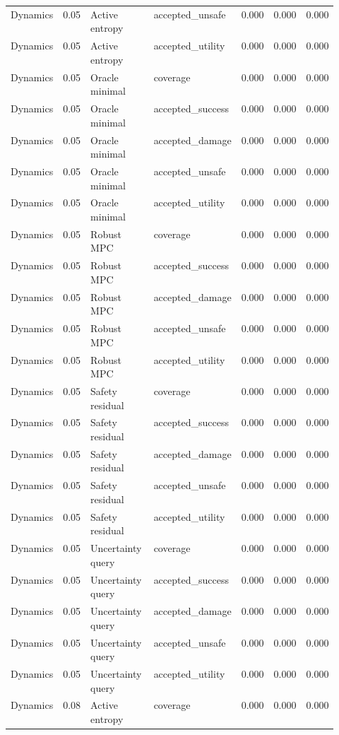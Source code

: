 \documentclass{article}
\begin{document}
\begin{center}
\begin{longtable}{p{0.13\linewidth}rp{0.22\linewidth}p{0.19\linewidth}rrr}
Dynamics & 0.05 & Active entropy & accepted\_unsafe & 0.000 & 0.000 & 0.000\\
Dynamics & 0.05 & Active entropy & accepted\_utility & 0.000 & 0.000 & 0.000\\
Dynamics & 0.05 & Oracle minimal & coverage & 0.000 & 0.000 & 0.000\\
Dynamics & 0.05 & Oracle minimal & accepted\_success & 0.000 & 0.000 & 0.000\\
Dynamics & 0.05 & Oracle minimal & accepted\_damage & 0.000 & 0.000 & 0.000\\
Dynamics & 0.05 & Oracle minimal & accepted\_unsafe & 0.000 & 0.000 & 0.000\\
Dynamics & 0.05 & Oracle minimal & accepted\_utility & 0.000 & 0.000 & 0.000\\
Dynamics & 0.05 & Robust MPC & coverage & 0.000 & 0.000 & 0.000\\
Dynamics & 0.05 & Robust MPC & accepted\_success & 0.000 & 0.000 & 0.000\\
Dynamics & 0.05 & Robust MPC & accepted\_damage & 0.000 & 0.000 & 0.000\\
Dynamics & 0.05 & Robust MPC & accepted\_unsafe & 0.000 & 0.000 & 0.000\\
Dynamics & 0.05 & Robust MPC & accepted\_utility & 0.000 & 0.000 & 0.000\\
Dynamics & 0.05 & Safety residual & coverage & 0.000 & 0.000 & 0.000\\
Dynamics & 0.05 & Safety residual & accepted\_success & 0.000 & 0.000 & 0.000\\
Dynamics & 0.05 & Safety residual & accepted\_damage & 0.000 & 0.000 & 0.000\\
Dynamics & 0.05 & Safety residual & accepted\_unsafe & 0.000 & 0.000 & 0.000\\
Dynamics & 0.05 & Safety residual & accepted\_utility & 0.000 & 0.000 & 0.000\\
Dynamics & 0.05 & Uncertainty query & coverage & 0.000 & 0.000 & 0.000\\
Dynamics & 0.05 & Uncertainty query & accepted\_success & 0.000 & 0.000 & 0.000\\
Dynamics & 0.05 & Uncertainty query & accepted\_damage & 0.000 & 0.000 & 0.000\\
Dynamics & 0.05 & Uncertainty query & accepted\_unsafe & 0.000 & 0.000 & 0.000\\
Dynamics & 0.05 & Uncertainty query & accepted\_utility & 0.000 & 0.000 & 0.000\\
Dynamics & 0.08 & Active entropy & coverage & 0.000 & 0.000 & 0.000\\

\end{longtable}
\end{center}
\end{document}
